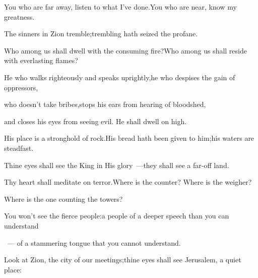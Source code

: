 
\begin{inparaenum}



  \pd{} You who are far away, listen to what I've done.\pa{}You who are near, know my greatness.%

  \pb{} The sinners in Zion tremble;\pa{}trembling hath seized the profane.%

  \pb{}Who among us shall dwell with the consuming fire?\pa{}Who among us shall reside with everlasting flames?%

  \pb{} He who walks righteously and speaks uprightly,\pa{}he who despises the gain of oppressors,%

  \pb{}who doesn't take bribes,\pa{}stops his ears from hearing of bloodshed,%

  \pb{}and closes his eyes from seeing evil.  He shall dwell on high.%

  \pb{}His place is a stronghold of rock.\pa{}His bread hath been given to him;\pa{}his waters are steadfast.%

  \pa{} Thine eyes shall see the King in His glory~---\pa{}they shall see a far-off land.%

  \pa{} Thy heart shall meditate on terror.\pa{}Where is the counter? Where is the weigher?%

  \pa{}Where is the one counting the towers?%

  \pa{} You won't see the fierce people:\pa{}a people of a deeper speech than you can understand%

  \pa{}~--- of a stammering tongue that you cannot understand.%

  \pa{} Look at Zion, the city of our meetings;\pa{}thine eyes shall see Jerusalem, a quiet place:%


\end{inparaenum}
